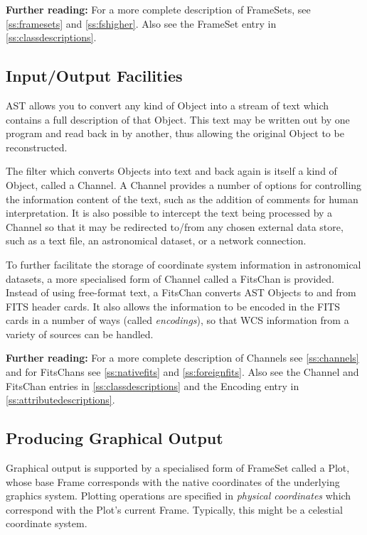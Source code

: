 \documentclass[twoside,11pt]{article}
\newcommand{\appref}[1]{Appendix~\ref{#1}}
\newcommand{\secref}[1]{\S\ref{#1}}
\renewcommand{\appref}[1]{\ref{#1}}
\renewcommand{\secref}[1]{\ref{#1}}
\begin{document}
{\bf{Further reading:}} For a more complete description of
FrameSets, see \secref{ss:framesets} and \secref{ss:fshigher}. Also
see the FrameSet entry in \appref{ss:classdescriptions}.

\subsection{Input/Output Facilities}

AST allows you to convert any kind of Object into a stream of text
which contains a full description of that Object. This text may be
written out by one program and read back in by another, thus allowing
the original Object to be reconstructed.

The filter which converts Objects into text and back again is itself a
kind of Object, called a Channel. A Channel provides a number of
options for controlling the information content of the text, such as
the addition of comments for human interpretation.  It is also
possible to intercept the text being processed by a Channel so that it
may be redirected to/from any chosen external data store, such as a
text file, an astronomical dataset, or a network connection.

To further facilitate the storage of coordinate system information in
astronomical datasets, a more specialised form of Channel called a
FitsChan is provided. Instead of using free-format text, a FitsChan
converts AST Objects to and from FITS header cards. It also allows the
information to be encoded in the FITS cards in a number of ways
(called {\em{encodings}}), so that WCS information from a variety of
sources can be handled.

{\bf{Further reading:}} For a more complete description of Channels
see \secref{ss:channels} and for FitsChans see \secref{ss:nativefits}
and \secref{ss:foreignfits}. Also see the Channel and FitsChan entries
in \appref{ss:classdescriptions} and the Encoding entry in
\appref{ss:attributedescriptions}.

\subsection{Producing Graphical Output}

Graphical output is supported by a specialised form of FrameSet called
a Plot, whose base Frame corresponds with the native coordinates of
the underlying graphics system.  Plotting operations are specified in
{\em{physical coordinates}} which correspond with the Plot's current
Frame. Typically, this might be a celestial coordinate system.
\end{document}
